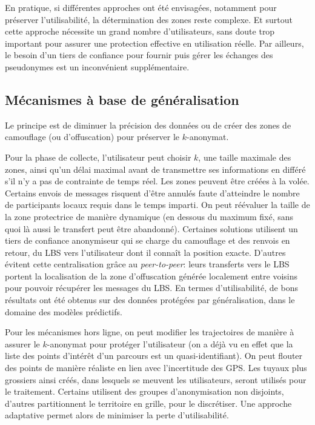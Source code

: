 \documentclass[a4paper,11pt]{article} %
\begin{document}
En pratique, si différentes approches ont été envisagées, notamment pour préserver l'utilisabilité, la détermination des zones reste complexe. 
Et surtout cette approche nécessite un grand nombre d'utilisateurs, sans doute trop important pour assurer une protection effective en utilisation réelle. 
Par ailleurs, le besoin d'un tiers de confiance pour fournir puis gérer les échanges des pseudonymes est un inconvénient supplémentaire.
%
\subsection{Mécanismes à base de généralisation}
%
Le principe est de diminuer la précision des données ou de créer des zones \og de camouflage\fg{}  (ou d'offuscation) pour préserver le $k$-anonymat. 

Pour la phase de collecte, l'utilisateur peut choisir $k$, une taille maximale des zones, ainsi qu'un délai maximal avant de transmettre ses informations en différé s'il n'y a pas de contrainte de temps réel. 
Les zones peuvent être créées à la volée.
Certains envois de messages risquent d'être annulés faute d'atteindre le nombre de participants locaux requis dans le temps imparti. 
On peut réévaluer la taille de la zone protectrice de manière dynamique (en dessous du maximum fixé, sans quoi là aussi le transfert peut être abandonné).
Certaines solutions utilisent un tiers de confiance anonymiseur qui se charge du camouflage et des renvois en retour, du LBS vers l'utilisateur dont il connaît la position exacte. D'autres évitent cette centralisation grâce au \emph{peer-to-peer}: leurs transferts vers le LBS portent la localisation de la zone d'offuscation générée localement entre voisins pour pouvoir récupérer les messages du LBS. 
En termes d'utilisabilité, de bons résultats ont été obtenus sur des données protégées par généralisation, dans le domaine des modèles prédictifs.

Pour les mécanismes hors ligne, on peut modifier les trajectoires de manière à assurer le $k$-anonymat pour protéger l'utilisateur (on a déjà vu en effet que la liste des points d'intérêt d'un parcours est un quasi-identifiant). 
On peut flouter des points de manière réaliste en lien avec l'incertitude des GPS. 
Les \og tuyaux\fg{} plus grossiers ainsi créés, dans lesquels se meuvent les utilisateurs, seront utilisés pour le traitement.
Certains utilisent des groupes d'anonymisation non disjoints, d'autres partitionnent le territoire en grille, pour le discrétiser. Une approche adaptative permet alors de minimiser la perte d'utilisabilité. 
\end{document}
